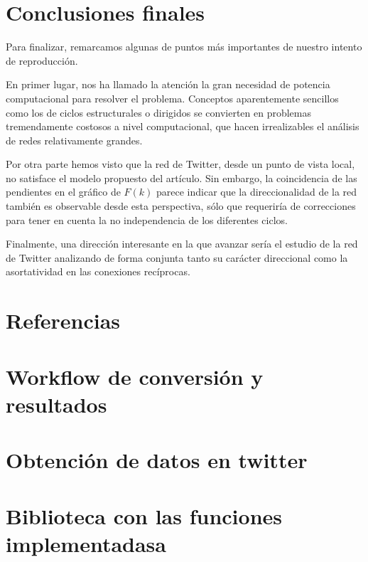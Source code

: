 \documentclass[1p]{elsarticle}
\begin{document}
\section{Conclusiones finales}
    Para finalizar, remarcamos algunas de puntos más importantes de nuestro intento de reproducción.

    En primer lugar, nos ha llamado la atención la gran necesidad de potencia computacional para resolver el problema. 
    Conceptos aparentemente sencillos como los de ciclos estructurales o dirigidos se convierten en problemas tremendamente costosos a nivel computacional, que hacen irrealizables el análisis de redes relativamente grandes.

    Por otra parte hemos visto que la red de Twitter, desde un punto de vista local, no satisface el modelo propuesto del artículo. Sin embargo, la coincidencia de las pendientes en el gráfico de $F(k)$ parece indicar que la direccionalidad de la red también es observable desde esta perspectiva, sólo que requeriría de correcciones para tener en cuenta la no independencia de los diferentes ciclos.

    Finalmente, una dirección interesante en la que avanzar sería el estudio de la red de Twitter analizando de forma conjunta tanto su carácter direccional como la asortatividad en las conexiones recíprocas.

\section*{Referencias}


\begin{appendices}
	
\section{Workflow de conversión y resultados}

\pagebreak

\section{Obtención de datos en twitter}

\pagebreak

\section{Biblioteca con las funciones implementadasa}


\end{appendices}
\end{document}
